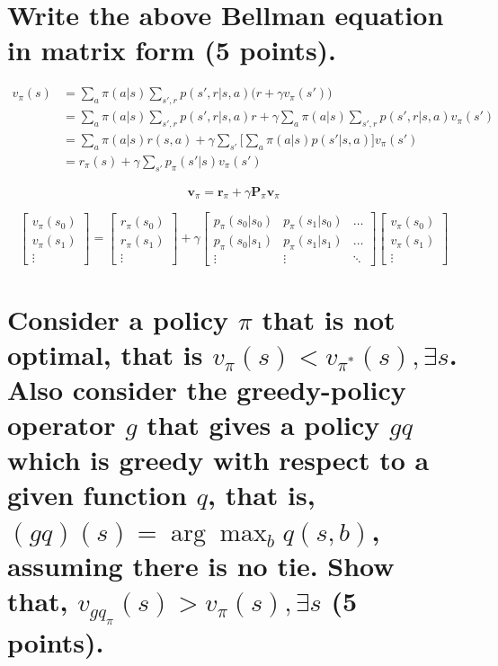 \documentclass[twoside]{article}
\newcommand{\vpi}{\mathbf{v}_{\pi}}
\newcommand{\rpi}{\mathbf{r}_{\pi}}
\newcommand{\Ppi}{\mathbf{P}_{\pi}}
\begin{document}
\section{\normalsize 
Write the above Bellman equation in matrix form
 (5 points).
}

\begin{align*}
	v_{\pi}(s) &= \sum_{a}{\pi(a|s)\sum_{s',r}{p(s',r|s,a)\big(r + \gamma v_{\pi}(s')\big)}}\\
	&= \sum_{a}{\pi(a|s)\sum_{s',r}{p(s',r|s,a)r}} + \gamma\sum_{a}{\pi(a|s)\sum_{s',r}{p(s',r|s,a)v_{\pi}(s')}}\\
	&= \sum_{a}{\pi(a|s)r(s,a)} + \gamma\sum_{s'}{\Big[\sum_{a}{\pi(a|s)p(s'|s,a)}\Big]v_{\pi}(s')}\\
	&= r_{\pi}(s) + \gamma \sum_{s'}{p_{\pi}(s'|s)v_{\pi}(s')}
\end{align*}

\begin{equation*}
\vpi = \rpi + \gamma \Ppi \vpi
\end{equation*}

\begin{equation*}
\begin{bmatrix}
v_{\pi}(s_0) \\
v_{\pi}(s_1) \\
\vdots
\end{bmatrix}
=
\begin{bmatrix}
r_{\pi}(s_0) \\
r_{\pi}(s_1) \\
\vdots
\end{bmatrix}
+ \gamma
\begin{bmatrix}
p_{\pi}(s_0|s_0) & p_{\pi}(s_1|s_0) & \dots \\
p_{\pi}(s_0|s_1) & p_{\pi}(s_1|s_1) & \dots \\
\vdots & \vdots & \ddots
\end{bmatrix}
\begin{bmatrix}
v_{\pi}(s_0) \\
v_{\pi}(s_1) \\
\vdots
\end{bmatrix}
\end{equation*}


\newpage

\section{\normalsize 
Consider a policy $\pi$ that is not optimal, that is $v_\pi(s) < v_{\pi^*}(s), \exists s$. Also consider the greedy-policy operator $g$ that gives a policy $gq$ which is greedy with respect to a given function $q$, that is, $(g q)(s) = \arg\max_b q(s, b)$, assuming there is no tie. Show that, $v_{gq_\pi}(s) > v_\pi(s), \exists s$
 (5 points).
}
\end{document}
